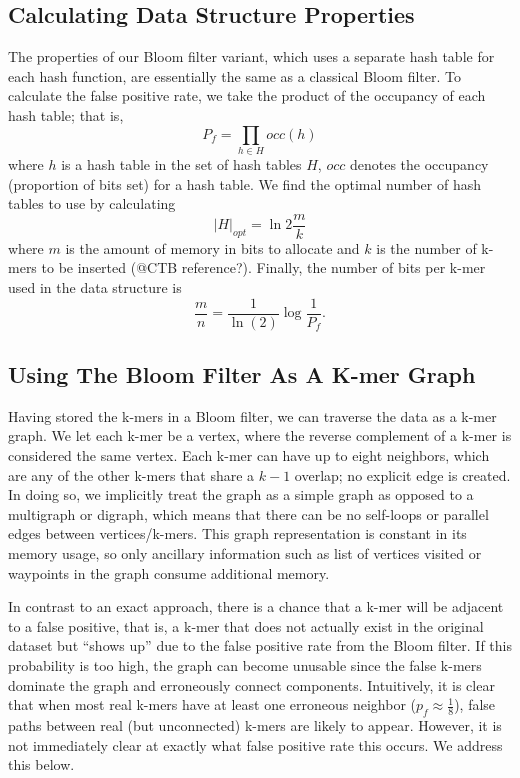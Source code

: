 \documentclass[12pt]{article} \usepackage{simplemargins}
\begin{document}
\subsection{Calculating Data Structure Properties}
The properties of our Bloom filter variant, which
uses a separate hash table for each hash function, are essentially the
same as a classical Bloom filter. To calculate the false positive rate, we
take the product of the occupancy of each hash table; that is,
\begin{displaymath}
P_f = \prod_{h \in H} occ(h)
\end{displaymath}
where $h$ is a hash table in the set of hash tables $H$, $occ$ denotes
the occupancy (proportion of bits set) for a hash table.
We find the optimal number of hash tables
to use by calculating
\begin{displaymath}
\vert H \vert_{opt} = \ln 2 \frac{m}{k}
\end{displaymath}
where $m$ is the amount of memory in bits to allocate and $k$
is the number of k-mers to be inserted (@CTB reference?). Finally,
the number of bits per
k-mer used in the data structure is
\begin{displaymath}
\frac{m}{n} = \frac{1}{\ln(2)} \log{\frac{1}{P_f}}.
\end{displaymath}

\subsection{Using The Bloom Filter As A K-mer Graph}
Having stored the k-mers in a Bloom filter, we can traverse
the data as a k-mer graph. We let each k-mer be a vertex, where
the reverse complement of a k-mer is considered the same
vertex. Each k-mer can
have up to eight neighbors, which are any of the other k-mers that
 share a $k-1$
overlap; no explicit edge is created. In doing so, we implicitly 
treat the graph as a simple graph as opposed to a multigraph or 
digraph, which means that there can be no self-loops or parallel 
edges between vertices/k-mers. This graph representation is constant 
in its memory usage, so only ancillary information such as list 
of vertices visited or waypoints in the graph consume additional 
memory.

In contrast to an exact approach, there is a chance that a k-mer 
will be adjacent to a false positive,
that is, a k-mer
that does not actually exist in the original dataset but ``shows up'' 
due to the false
positive rate from the Bloom filter. If this probability is too high, the 
graph can become unusable since the false k-mers dominate the graph 
and erroneously connect components.
Intuitively, it is clear that when most real k-mers
have at least one erroneous neighbor ($p_f \approx \frac{1}{8}$), 
false paths between real (but unconnected) k-mers are likely to 
appear. However, it is not immediately clear at exactly what 
false positive rate this occurs. We address this below.  %
\end{document}
